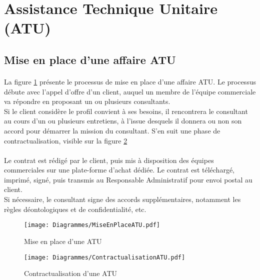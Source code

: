 \section{Assistance Technique Unitaire (ATU)}

\subsection{Mise en place d'une affaire ATU}

\paragraph{}La figure \ref{mepATU} présente le processus de mise en place d'une affaire ATU. Le processus débute avec l'appel d'offre d'un client, auquel un membre de l'équipe commerciale va répondre en proposant un ou plusieurs consultants.\\
Si le client considère le profil convient à ses besoins, il rencontrera le consultant au cours d'un ou plusieurs entretiens, à l'issue desquels il donnera ou non son accord pour démarrer la mission du consultant. S'en suit une phase de contractualisation, visible sur la figure \ref{contractATU}
\paragraph{} Le contrat est rédigé par le client, puis mis à disposition des équipes commerciales sur une plate-forme d'achat dédiée. Le contrat est téléchargé, imprimé, signé, puis transmis au Responsable Administratif pour envoi postal au client.\\
Si nécessaire, le consultant signe des accords supplémentaires, notamment les règles déontologiques et de confidentialité, etc.

\begin{figure}[H]
	\centering
	\texttt{[image: Diagrammes/MiseEnPlaceATU.pdf]}
	\caption{Mise en place d'une ATU} 
	\label{mepATU}
\end{figure}
	
	
\begin{figure}[H]
	\centering
	\texttt{[image: Diagrammes/ContractualisationATU.pdf]}
	\caption{Contractualisation d'une ATU} 
	\label{contractATU}
\end{figure}

